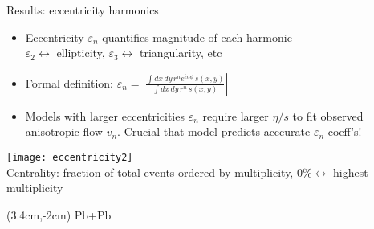 \documentclass[svgnames]{beamer}
\begin{document}
\begin{frame}{Results: eccentricity harmonics}
 \centering
 \begin{itemize}
  \item Eccentricity $\varepsilon_n$ quantifies magnitude of each harmonic \\
	 $\varepsilon_2 \leftrightarrow$ ellipticity, $\varepsilon_3 \leftrightarrow$ triangularity, etc
  \vspace{0.1 in}
  \item Formal definition: $\varepsilon_n = \left |\frac{\int dx \, dy\, r^n e^{i n \phi} \, s(x,y)}{\int dx \, dy \, r^n \, s(x,y)} \right|$
  \vspace{0.1 in}
  \item Models with larger eccentricities $\varepsilon_n$ require larger $\eta/s$ to fit observed anisotropic flow $v_n$. 
	Crucial that model predicts acccurate $\varepsilon_n$ coeff's!
 \end{itemize}
 \vspace{0.1 in}
 \texttt{[image: eccentricity2]}\\
 \vspace{0.1 in}
 \scriptsize Centrality: fraction of total events ordered by multiplicity, $0\% \leftrightarrow$ highest multiplicity

 \begin{textblock*}{0.05\textwidth}(3.4cm,-2cm)
  \small Pb+Pb
 \end{textblock*}
\end{frame}
\end{document}
